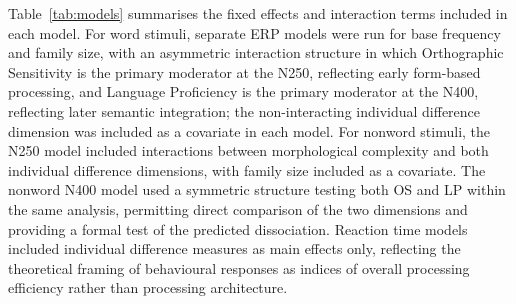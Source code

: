 \documentclass[utf8]{FrontiersinHarvard} %
\begin{document}
	Table~\ref{tab:models} summarises the fixed effects and interaction terms included in each model. For word stimuli, separate ERP models were run for base frequency and family size, with an asymmetric interaction structure in which Orthographic Sensitivity is the primary moderator at the N250, reflecting early form-based processing, and Language Proficiency is the primary moderator at the N400, reflecting later semantic integration; the non-interacting individual difference dimension was included as a covariate in each model. For nonword stimuli, the N250 model included interactions between morphological complexity and both individual difference dimensions, with family size included as a covariate. The nonword N400 model used a symmetric structure testing both OS and LP within the same analysis, permitting direct comparison of the two dimensions and providing a formal test of the predicted dissociation. Reaction time models included individual difference measures as main effects only, reflecting the theoretical framing of behavioural responses as indices of overall processing efficiency rather than processing architecture.
	
\end{document}
